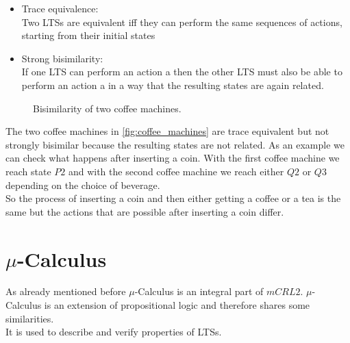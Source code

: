 \documentclass{clseminar}
\begin{document}
  \begin{itemize}[noitemsep]
    \item Trace equivalence: \\
    Two LTSs are equivalent iff they can perform the same sequences of actions, starting from their initial states \\
    \item Strong bisimilarity: \\
    If one LTS can perform an action a then the other LTS must also be able to perform an action a in a way that the resulting states are again related. \\
  \end{itemize}

  \begin{figure}[!ht]
    \resizebox{\textwidth}{!}{}
    \caption{Bisimilarity of two coffee machines.}
    \label{fig:coffee_machines}
  \end{figure}

  The two coffee machines in \autoref{fig:coffee_machines} are trace equivalent but not strongly bisimilar because the resulting states are not related. As an example we can check what happens after inserting a coin. With the first coffee machine we reach state $P2$ and with the second coffee machine we reach either $Q2$ or $Q3$ depending on the choice of beverage.\\
  So the process of inserting a coin and then either getting a coffee or a tea is the same but the actions that are possible after inserting a coin differ.

  \section{$\mu$-Calculus}
  As already mentioned before $\mu$-Calculus is an integral part of $mCRL2$. $\mu$-Calculus is an extension of propositional logic and therefore shares some similarities. \\
  It is used to describe and verify properties of LTSs.
\end{document}

